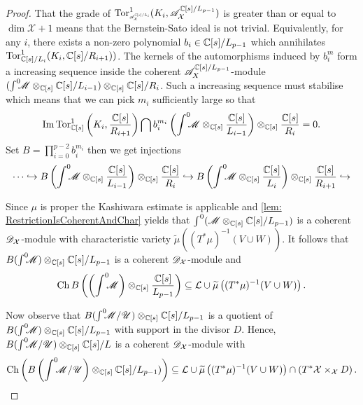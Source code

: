 \begin{proof}
  That the grade of $\Tor_{\scaleto{\A_\mathcal{X}^{\C[s]/L_i}}{7pt}}^1(K_i, \A_\mathcal{X}^{\C[s]/L_{p-1}})$ is greater than or equal to $\dim \mathcal{X}+1$ means that the Bernstein-Sato ideal is not trivial.
  Equivalently, for any $i$, there exists a non-zero polynomial $b_i\in \mathbb{C}[s]/L_{p-1}$ which annihilates $\operatorname{Tor}_{\mathbb{C}[s]/L_{i} }^1(K_i, \mathbb{C}[s]/R_{i+1} ))$.
  The kernels of the automorphisms induced by $b_i^m$ form a increasing sequence inside the coherent $\mathscr{A}_X^{\mathbb{C}[s]/L_{p-1}}$-module $(\int^0 \mkern -8mu \mathscr{M}\otimes_{\mathbb{C}[s]}\mathbb{C}[s]/L_{i-1})\otimes_{\mathbb{C}[s]}\mathbb{C}[s]/R_{i}$.
  Such a increasing sequence must stabilise which means that we can pick $m_i$ sufficiently large so that $$\operatorname{Im} \operatorname{Tor}_{\mathbb{C}[s]}^1\left(K_i, \frac{\mathbb{C}[s]}{R_{i+1}}\right)\bigcap b_i^{m_i}\left(\int^0 \mkern -8mu \mathscr{M}\otimes_{\mathbb{C}[s]}\frac{\mathbb{C}[s]}{L_{i-1}}\right)\otimes_{\mathbb{C}[s]}\frac{\mathbb{C}[s]}{R_{i}} = 0.$$
  Set $B = \prod_{i=0}^{p-2} b_i^{m_i}$ then we get injections
  $$\cdots \hookrightarrow B \left(\int^0 \mkern -8mu \mathscr{M}\otimes_{\mathbb{C}[s]}\frac{\mathbb{C}[s]}{L_{i-1}}\right) \otimes_{\mathbb{C}[s]}\frac{\mathbb{C}[s]}{R_{i}} \hookrightarrow B\left(\int^0 \mkern -8mu\mathscr{M}\otimes_{\mathbb{C}[s]}\frac{\mathbb{C}[s]}{L_i}\right)\otimes_{\mathbb{C}[s]}\frac{\mathbb{C}[s]}{R_{i+1}}\hookrightarrow  $$


  Since $\mu$ is proper the Kashiwara estimate is applicable and \cref{lem: RestrictionIsCoherentAndChar} yields that $\int^0(\mathscr{M}\otimes_{\mathbb{C}[s]} \mathbb{C}[s]/L_{p-1})$ is a coherent $\mathscr{D}_\mathcal{X}$-module with characteristic variety $\widetilde{\mu}\left((T^*\mu)^{-1}(V\cup W)\right)$.
  It follows that $B(\int^0 \mkern -8mu\mathscr{M})\otimes_{\mathbb{C}[s]}\mathbb{C}[s]/L_{p-1}$ is a coherent $\mathscr{D}_\mathcal{X}$-module
  and
  $$ \operatorname{Ch} B \left(\left(\int^0 \mkern -8mu\mathscr{M}\right)\otimes_{\mathbb{C}[s]}\frac{\mathbb{C}[s]}{L_{p-1}}\right)\subseteq \mathcal{L} \cup \widetilde{\mu}\left((T^*\mu)^{-1}(V\cup W)\right).$$

  Now observe that $B(\int^0 \mkern -8mu\mathscr{M}/ \mathscr{U})\otimes_{\mathbb{C}[s]}\mathbb{C}[s]/L_{p-1}$ is a quotient of $B(\int^0 \mkern -8mu\mathscr{M}) \otimes_{\mathbb{C}[s]} \mathbb{C}[s]/L_{p-1}$ with support in the divisor $D$.
  Hence, $B(\int^0 \mkern -8mu\mathscr{M}/ \mathscr{U})\otimes_{\mathbb{C}[s]}\mathbb{C}[s]/L$ is a coherent $\mathscr{D}_\mathcal{X}$-module with
  $$\operatorname{Ch}\left( B\left(\int^0 \mkern -8mu\mathscr{M}/ \mathscr{U}\right)\otimes_{\mathbb{C}[s]}\mathbb{C}[s]/L_{p-1}) \right)\subseteq \mathcal{L} \cup \widetilde{\mu}\left((T^*\mu)^{-1}(V\cup W)\right) \cap \left(T^*\mathcal{X}\times_\mathcal{X} D\right).$$


\end{proof}
